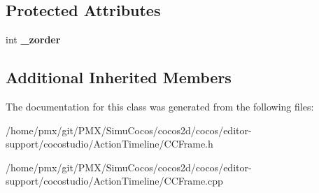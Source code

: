 \subsection*{Protected Attributes}
\begin{DoxyCompactItemize}
\item 
\mbox{\label{classZOrderFrame_ae97d8a3856706323ef63ef32563950ee}} 
int {\bfseries \+\_\+zorder}
\end{DoxyCompactItemize}
\subsection*{Additional Inherited Members}


The documentation for this class was generated from the following files\+:\begin{DoxyCompactItemize}
\item 
/home/pmx/git/\+P\+M\+X/\+Simu\+Cocos/cocos2d/cocos/editor-\/support/cocostudio/\+Action\+Timeline/C\+C\+Frame.\+h\item 
/home/pmx/git/\+P\+M\+X/\+Simu\+Cocos/cocos2d/cocos/editor-\/support/cocostudio/\+Action\+Timeline/C\+C\+Frame.\+cpp\end{DoxyCompactItemize}
